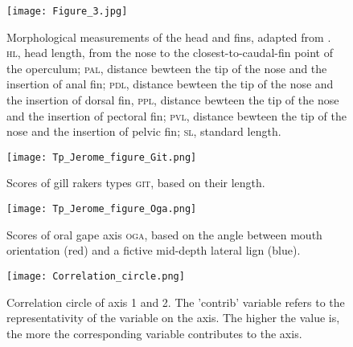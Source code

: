 \begin{figure} [!htbp]
	\begin{center}
		\texttt{[image: Figure\_3.jpg]}
		\caption[Fins morphological measurements]{Morphological measurements of the head and fins, adapted from \citet{keat-chuanng2017,habib2019}. \textsc{hl}, head length, from the nose to the closest-to-caudal-fin point of the operculum; \textsc{pal}, distance bewteen the tip of the nose and the insertion of anal fin; \textsc{pdl}, distance bewteen the tip of the nose and the insertion of dorsal fin, \textsc{ppl}, distance bewteen the tip of the nose and the insertion of pectoral fin; \textsc{pvl}, distance bewteen the tip of the nose and the insertion of pelvic fin;  \textsc{sl}, standard length.}
		\label{fig:fin}
	\end{center}
	
\end{figure}


\begin{figure} [!htbp]
	\begin{center}
	\begin{minipage}{0.45\textwidth}
		\centering
		\texttt{[image: Tp\_Jerome\_figure\_Git.png]}
		\caption[Gill raker types categorical scores]{Scores of gill rakers types \textsc{git}, based on their length.}
		\label{fig:git}
	\end{minipage}\hfill
	\begin{minipage}{0.45\textwidth}
		\centering
		\texttt{[image: Tp\_Jerome\_figure\_Oga.png]}
		\caption[Oral gape axis categorical scores]{Scores of oral gape axis \textsc{oga}, based on the angle between mouth orientation (red) and a fictive mid-depth lateral lign (blue).}
		\label{fig:oga}
	\end{minipage}
	\end{center}
	
\end{figure}

\begin{figure} [!htbp]
	\begin{center}
		\texttt{[image: Correlation\_circle.png]}
	\end{center}
	\caption[FAMD's correlation circle for first and second axis]{Correlation circle of axis 1 and 2. The 'contrib' variable refers to the representativity of the variable on the axis. The higher the value is, the more the corresponding variable contributes to the axis.}
	\label{fig:corr_circ_12}
\end{figure}

